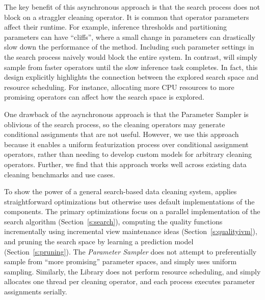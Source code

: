  The key benefit of this asynchronous approach is that the search process does not block on a straggler cleaning operator.  It is common that operator parameters affect their runtime.  For example, inference thresholds and partitioning parameters can have ``cliffs'', where a small change in parameters can drastically slow down the performance of the method. Including such parameter settings in the search process naively would block the entire system.  In contrast, \sys will simply sample from faster operators until the slow inference task completes.    In fact, this design explicitly highlights the connection between the explored search space and resource scheduling.  For instance,  allocating more CPU resources to more promising operators can affect how the search space is explored.

One drawback of the asynchronous approach is that the Parameter Sampler is oblivious of the search process, so the cleaning operators may generate conditional assignments that are not useful.  However, we use this approach because it enables a uniform featurization process over conditional assignment operators, rather than needing to develop custom models for arbitrary cleaning operators.  Further, we find that this approach works well across existing data cleaning benchmarks and use cases.  

To show the power of a general search-based data cleaning system, \sys applies straightforward optimizations but otherwise uses default implementations of the components.  The primary optimizations focus on a parallel implementation of the search algorithm (Section~\ref{s:search}), computing the quality functions incrementally using incremental view maintenance ideas (Section~\ref{s:qualityivm}), and pruning the search space by learning a prediction model (Section~\ref{s:pruning}).  The {\it Parameter Sampler} does not attempt to preferentially sample from ``more promising'' parameter spaces, and simply uses uniform sampling.  Similarly, the Library does not perform resource scheduling, and simply allocates one thread per cleaning operator, and each process executes parameter assignments serially. 




